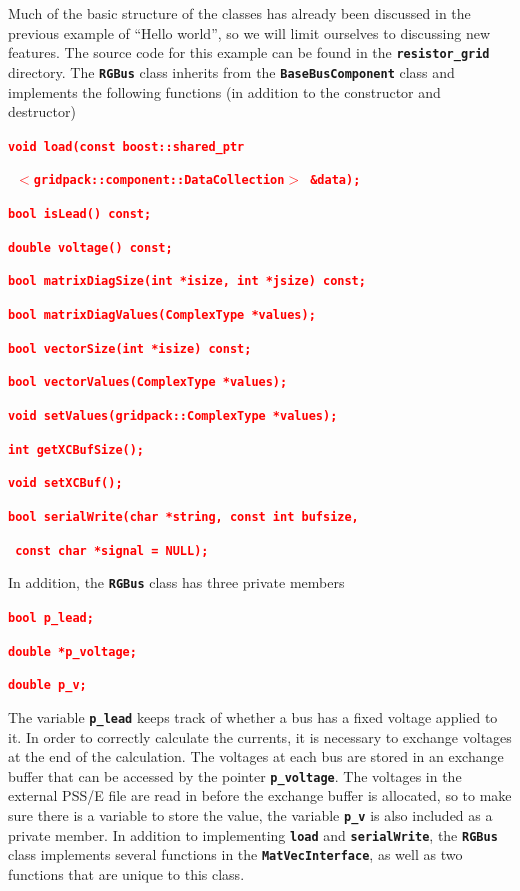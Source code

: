\documentclass[12pt]{report} %
\begin{document}
Much of the basic structure of the classes has already been discussed in the previous example of ``Hello world'', so we will limit ourselves to discussing new features. The source code for this example can be found in the \texttt{\textbf{resistor\_grid}} directory. The \texttt{\textbf{RGBus}} class inherits from the \texttt{\textbf{BaseBusComponent}} class and implements the following functions (in addition to the constructor and destructor)

\textcolor{red}{\texttt{\textbf{void load(const boost::shared\_ptr}}}

\textcolor{red}{\texttt{\textbf{  $\boldsymbol{\mathrm{<}}$gridpack::component::DataCollection$\boldsymbol{\mathrm{>}}$ \&data);}}}

\textcolor{red}{\texttt{\textbf{bool isLead() const;}}}

\textcolor{red}{\texttt{\textbf{double voltage() const;}}}

\textcolor{red}{\texttt{\textbf{bool matrixDiagSize(int *isize, int *jsize) const;}}}

\textcolor{red}{\texttt{\textbf{bool matrixDiagValues(ComplexType *values);}}}

\textcolor{red}{\texttt{\textbf{bool vectorSize(int *isize) const;}}}

\textcolor{red}{\texttt{\textbf{bool vectorValues(ComplexType *values);}}}

\textcolor{red}{\texttt{\textbf{void setValues(gridpack::ComplexType *values);}}}

\textcolor{red}{\texttt{\textbf{int getXCBufSize();}}}

\textcolor{red}{\texttt{\textbf{void setXCBuf();}}}

\textcolor{red}{\texttt{\textbf{bool serialWrite(char *string, const int bufsize,}}}

\textcolor{red}{\texttt{\textbf{  const char *signal = NULL);}}}

In addition, the \texttt{\textbf{RGBus}} class has three private members

\textcolor{red}{\texttt{\textbf{bool p\_lead;}}}

\textcolor{red}{\texttt{\textbf{double *p\_voltage;}}}

\textcolor{red}{\texttt{\textbf{double p\_v;}}}

The variable \texttt{\textbf{p\_lead}} keeps track of whether a bus has a fixed voltage applied to it. In order to correctly calculate the currents, it is necessary to exchange voltages at the end of the calculation. The voltages at each bus are stored in an exchange buffer that can be accessed by the pointer \texttt{\textbf{p\_voltage}}. The voltages in the external PSS/E file are read in before the exchange buffer is allocated, so to make sure there is a variable to store the value, the variable \texttt{\textbf{p\_v}} is also included as a private member. In addition to implementing \texttt{\textbf{load}} and \texttt{\textbf{serialWrite}}, the \texttt{\textbf{RGBus}} class implements several functions in the \texttt{\textbf{MatVecInterface}}, as well as two functions that are unique to this class.
\end{document}
